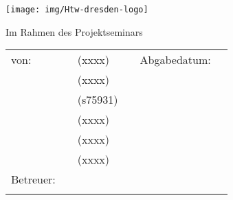 \begin{titlepage}
    \thispagestyle{empty}
    \enlargethispage{35mm}
    \setlength{\headheight}{0mm}

    \sffamily



    \iftitlelogo{}
        \hspace{-1cm}\texttt{[image: img/Htw-dresden-logo]}
    \else
        {%
            \mdseries
            \Huge \MakeUppercase{\myDefUniversity}\\\vspace{0.5em}
        }
    \fi

    \vfill
    \vspace{10mm}
    \begin{center}
        \begin{huge}
            \myDefTitle{}
            \vfill
        \end{huge}
        \begin{Large}
            Im Rahmen des Projektseminars \\ 
            \myDefSeminar{}
            \vfill
        \end{Large}

    \end{center}

    \vfill
    \iftitlefinal{}
        \begin{small}
            \begin{tabularx}{\textwidth}{lllXll}
            	von: & \myDefAuthorA{} & (xxxx) & & Abgabedatum:  & \myDefDateHandIn{}\\
            	& \myDefAuthorB{} & (xxxx) \\
            	& \myDefAuthorC{} & (s75931) \\
            	& \myDefAuthorD{} & (xxxx) \\
            	& \myDefAuthorE{} & (xxxx) \\
            	& \myDefAuthorF{} & (xxxx) \\
                Betreuer:    & \multicolumn{2}{l}{\myDefSupervisor{}} \\
                &  \multicolumn{2}{l}{\myDefChair{}} \\
            \end{tabularx}
        \end{small}
        \vspace{2em}
    \fi
    \vspace{3em}

    \normalsize

\end{titlepage}

